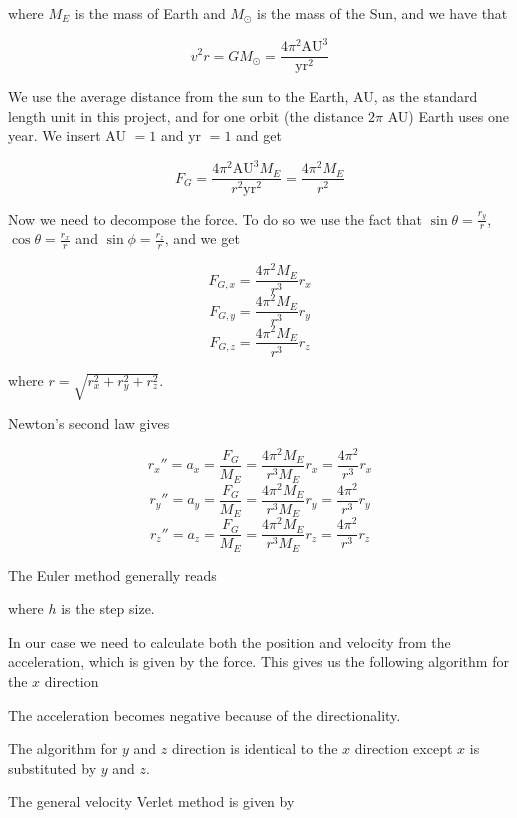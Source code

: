 \documentclass{article}
\begin{document}
where $M_E$ is the mass of Earth and $M_{\odot}$ is the mass of the Sun, and we have that

$$v^2r=GM_{\odot}=\frac{4\pi^2\mathrm{AU}^3}{\mathrm{yr}^2}$$

We use the average distance from the sun to the Earth, AU, as the standard length unit in this project, and for one orbit (the distance $2\pi$ AU) Earth uses one year. We insert AU $=1$ and yr $=1$ and get

$$F_G=\frac{4\pi^2\mathrm{AU}^3M_E}{r^2\mathrm{yr}^2}=\frac{4\pi^2M_E}{r^2}$$


Now we need to decompose the force. To do so we use the fact that $\sin \theta=\frac{r_y}{r}$, $\cos \theta=\frac{r_x}{r}$ and $\sin\phi=\frac{r_z}{r}$, and we get

$$F_{G,x}=\frac{4\pi^2M_E}{r^3}r_x$$
$$F_{G,y}=\frac{4\pi^2M_E}{r^3}r_y$$
$$F_{G,z}=\frac{4\pi^2M_E}{r^3}r_z$$

where $r=\sqrt{r_x^2+r_y^2+r_z^2}$.

Newton's second law gives

$$r_x''=a_x=\frac{F_G}{M_E}=\frac{4\pi^2M_E}{r^3M_E}r_x=\frac{4\pi^2}{r^3}r_x$$
$$r_y''=a_y=\frac{F_G}{M_E}=\frac{4\pi^2M_E}{r^3M_E}r_y=\frac{4\pi^2}{r^3}r_y$$
$$r_z''=a_z=\frac{F_G}{M_E}=\frac{4\pi^2M_E}{r^3M_E}r_z=\frac{4\pi^2}{r^3}r_z$$

\vskip0.5cm
The Euler method generally reads
\vskip0.5cm
\begin{algorithm}[H]
\end{algorithm}
\vskip0.5cm

where $h$ is the step size.

In our case we need to calculate both the position and velocity from the acceleration, which is given by the force. This gives us the following algorithm for the $x$ direction

\vskip0.5cm
\begin{algorithm}[H]
\end{algorithm}
\vskip0.5cm
The acceleration becomes negative because of the directionality.

The algorithm for $y$ and $z$ direction is identical to the $x$ direction except $x$ is substituted by $y$ and $z$.

\vskip0.7cm
The general velocity Verlet method is given by

\vskip0.5cm
\begin{algorithm}[H]
\end{algorithm}
\vskip0.5cm
\end{document}
